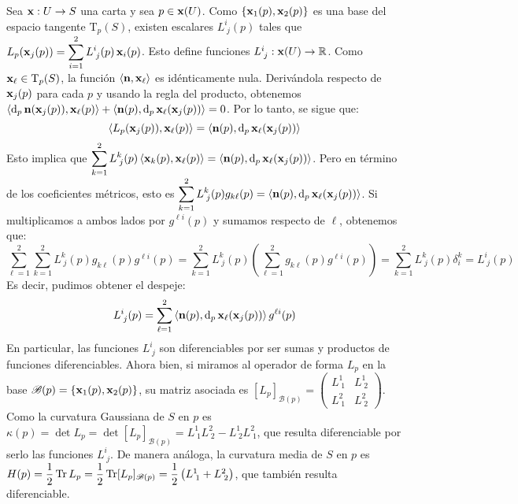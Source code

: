 Sea $\x:U\to S$ una carta y sea $p\in\x(U)$. Como $\{\x_1(p),\x_2(p)\}$ es una base del espacio tangente $\mathrm{T}_p(S)$, existen escalares $L^i_{\; j}(p)$ tales que $L_p(\x_j(p))=\displaystyle\sum_{i=1}^2 L^i_{\; j}(p) \x_i(p)$. Esto define funciones $L^i_{\; j}:\x(U)\to\RR$. Como $\x_\ell\in\mathrm{T}_p(S)$, la función $\pint{\n,\x_\ell}$ es idénticamente nula. Derivándola respecto de $\x_j(p)$ para cada $p$ y usando la regla del producto, obtenemos $\pint{\diff_p\n(\x_j(p)),\x_\ell(p)}+\pint{\n(p),\diff_p\x_\ell(\x_j(p))} = 0$. Por lo tanto, se sigue que: $$\pint{L_p(\x_j(p)),\x_\ell(p)} = \pint{\n(p),\diff_p\x_\ell(\x_j(p))}$$ Esto implica que $\displaystyle\sum_{k=1}^2 L^k_{\; j}(p)\pint{\x_k(p),\x_\ell(p)} = \pint{\n(p),\diff_p\x_\ell(\x_j(p))}$. Pero en término de los coeficientes métricos, esto es $\displaystyle\sum_{k=1}^2 L^k_{\; j}(p) g_{k\ell}(p) = \pint{\n(p),\diff_p\x_\ell(\x_j(p))}$. Si multiplicamos a ambos lados por $g^{\ell i}(p)$ y sumamos respecto de $\ell$, obtenemos que: $$\displaystyle\sum_{\ell=1}^2 \sum_{k=1}^2 L^k_{\; j}(p)g_{k\ell}(p)g^{\ell i}(p) = \sum_{k=1}^2 L^k_{\; j}(p)\left(\sum_{\ell=1}^2 g_{k\ell}(p)g^{\ell i}(p)\right) = \sum_{k=1}^2 L^k_{\; j}(p) \delta_{i}^k = L^i_{\;j}(p)$$ Es decir, pudimos obtener el despeje: \begin{eqnarray}\label{eq::ecestructura}L^i_{\;j}(p) = \displaystyle\sum_{\ell=1}^2 \pint{\n(p),\diff_p\x_\ell(\x_j(p))}g^{\ell i}(p)\end{eqnarray} En particular, las funciones $L^i_{\;j}$ son diferenciables por ser sumas y productos de funciones diferenciables. Ahora bien, si miramos al operador de forma $L_p$ en la base ${\mathscr{B}(p)=\{\x_1(p),\x_2(p)\}}$, su matriz asociada es $[L_p]_{\mathscr{B}(p)}=\begin{pmatrix}L^1_{\;1}&L^1_{\;2}\\ L^2_{\; 1}& L^2_{\; 2}\end{pmatrix}$. Como la curvatura Gaussiana de $S$ en $p$ es $\kappa(p)=\det L_p = \det [L_p]_{\mathscr{B}(p)} = L^1_{\;1}L^{2}_{\;2}-L^{1}_{\;2}L^2_{\;1}$, que resulta diferenciable por serlo las funciones $L^{i}_{\;j}$. De manera análoga, la curvatura media de $S$ en $p$ es $H(p)=\dfrac{1}{2}\tr L_p =\dfrac{1}{2}\tr [L_p]_{\mathscr{B}(p)} =\dfrac{1}{2}\left(L^1_{\;1} + L^2_{\; 2}\right)$, que también resulta diferenciable.

